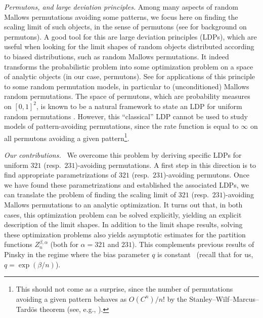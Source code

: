 \documentclass[a4paper,11pt]{amsart}
\theoremstyle{definition}
\begin{document}
{\em Permutons, and large deviation principles.}
Among many aspects of random Mallows permutations avoiding some patterns,
we focus here on finding the scaling limit of such objects, in the sense of permutons
(see  for background on permutons).
A good tool for this are large deviation principles (LDPs), which are useful when looking for
the limit shapes of random objects distributed
according to biased distributions, such as random Mallows permutations.
It indeed transforms the probabilistic problem into some optimization problem on a space of analytic objects (in our case, permutons). See \cite{starr2009mallows,mukherjee2016exponential_permutations,kenyon2020fixed_densities} for applications of this principle to some random permutation models,
in particular to (unconditioned) Mallows random permutations.
The space of permutons, which are probability measures on $[0,1]^2$,
 is known to be a natural framework to state
an LDP for uniform random permutations \cite{trashorras2008large_deviations,kenyon2020fixed_densities}. 
However, this ``classical'' LDP cannot be used to study models of pattern-avoiding permutations, since the rate function is equal to $\infty$ on all permutons avoiding a given pattern\footnote{
This should not come as a surprise, since the number of permutations avoiding a given pattern behaves as $O(C^n)/n!$ by the Stanley--Wilf--Marcus--Tardös theorem (see, e.g., \cite[Chapter 4]{BonaLivre}).
}.
\bigskip


{\em Our contributions.} 
We overcome this problem by deriving specific LDPs for uniform $321$ (resp.~$231$)-avoiding permutations.
A first step in this direction is to find appropriate parametrizations of $321$ (resp.~$231$)-avoiding permutons.
Once we have found these parametrizations and established the associated LDPs,
we can translate the problem of finding the scaling limit of $321$ (resp.~$231$)-avoiding
Mallows permutations to an analytic optimization. 
It turns out that, in both cases,
this optimization problem can be solved explicitly,
yielding an explicit description of the limit shapes.
In addition to the limit shape results, solving these optimization problems
also yields asymptotic estimates for the partition functions $Z_n^{\beta,\alpha}$ (both for $\alpha=321$ and $231$).
This complements previous results of Pinsky
in the regime where the bias parameter $q$ is constant~\cite{pinsky2021avoidance_Mallows}
(recall that for us, $q=\exp(\beta/n)$).
\end{document}
